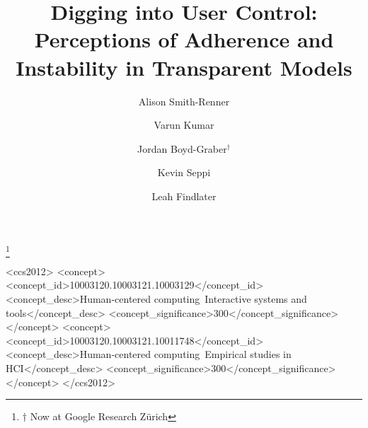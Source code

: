 \documentclass[sigconf]{acmart}
\newcommand{\latexfile}[1]{}
\begin{document}
\title{Digging into User Control: Perceptions of Adherence and Instability in Transparent Models}

\author{Alison Smith-Renner}

\author{Varun Kumar}

\author{Jordan Boyd-Graber$^\dagger$}
\thanks{$\dagger$ Now at Google Research Z\"urich}

\author{Kevin Seppi}

\author{Leah Findlater}

\renewcommand{\shortauthors}{Smith-Renner et al.}

\begin{abstract}
\latexfile{00-abstract}
\end{abstract}


\begin{CCSXML}
<ccs2012>
   <concept>
       <concept_id>10003120.10003121.10003129</concept_id>
       <concept_desc>Human-centered computing~Interactive systems and tools</concept_desc>
       <concept_significance>300</concept_significance>
       </concept>
   <concept>
       <concept_id>10003120.10003121.10011748</concept_id>
       <concept_desc>Human-centered computing~Empirical studies in HCI</concept_desc>
       <concept_significance>300</concept_significance>
       </concept>
 </ccs2012>
\end{CCSXML}




\maketitle
\end{document}
